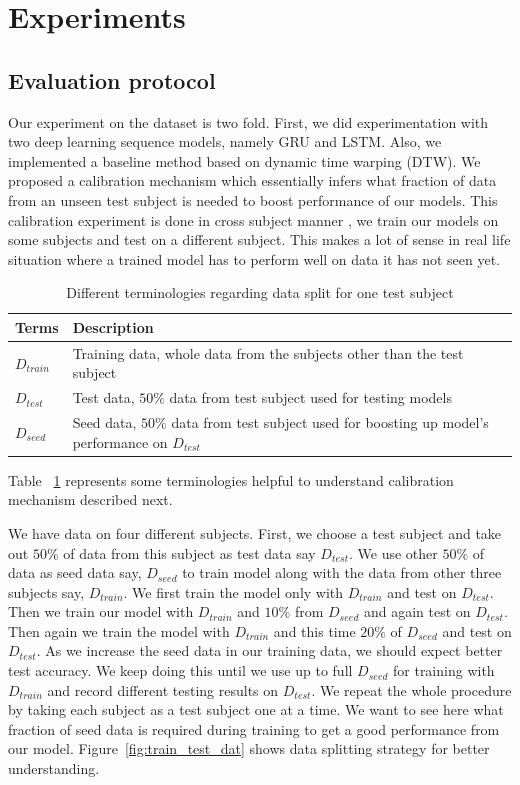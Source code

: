 \documentclass[10pt,twocolumn,letterpaper]{article}
\begin{document}
\section{Experiments}

\subsection{Evaluation protocol}

Our experiment on the dataset is two fold. First, we did experimentation with two deep learning sequence models, namely GRU and LSTM. Also, we implemented a baseline method based on dynamic time warping (DTW). We proposed a calibration mechanism which essentially infers what fraction of data from an unseen test subject is needed to boost performance of our models. This calibration experiment is done in cross subject manner \eg, we train our models on some subjects and test on a different subject. This makes a lot of sense in real life situation where a trained model has to perform well on data it has not seen yet. 

\begin{table}[h]
	\begin{center}
		\begin{tabular}{|m{1cm}|m{5cm}|}
			\hline
			Terms & Description\\
			\hline\hline
			$D_{train}$ & Training data, whole data from the subjects other than the test subject \\
			\hline
			$D_{test}$ & Test data, $50\%$ data from test subject used for testing models\\
			\hline
			$D_{seed}$ & Seed data, $50\%$ data from test subject used for boosting up model's performance on $D_{test}$\\
			\hline
		\end{tabular}
	\end{center}
	\caption{Different terminologies regarding data split for one test subject}
	\label{table:terminology_eval}
\end{table}
Table ~\ref{table:terminology_eval} represents some terminologies helpful to understand calibration mechanism described next.

We have data on four different subjects. First, we choose a test subject and take out $50\%$ of data from this subject as test data say $D_{test}$. We use other $50\%$ of data as seed data say, $D_{seed}$ to train model along with the data from other three subjects say, $D_{train}$. We first train the model only with $D_{train}$ and test on $D_{test}$. Then we train our model with $D_{train}$ and $10\%$ from $D_{seed}$ and again test on $D_{test}$. Then again we train the model with $D_{train}$ and this time $20\%$ of $D_{seed}$ and test on $D_{test}$. As we increase the seed data in our training data, we should expect better test accuracy. We keep doing this until we use up to full $D_{seed}$ for training with $D_{train}$ and record different testing results on $D_{test}$. We repeat the whole procedure by taking each subject as a test subject one at a time. We want to see here what fraction of seed data is required during training to get a good performance from our model. Figure~\ref{fig:train_test_dat} shows data splitting strategy for better understanding.
\end{document}
